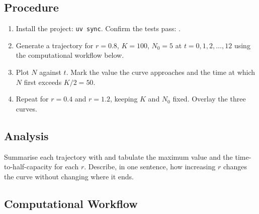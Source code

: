 \documentclass[
]{article}
\providecommand{\tightlist}{%
  \setlength{\itemsep}{0pt}\setlength{\parskip}{0pt}}
\theoremstyle{plain}
\theoremstyle{definition}
\begin{document}
\subsection{Procedure}\label{procedure-3}

\begin{enumerate}
\def\labelenumi{\arabic{enumi}.}
\tightlist
\item
  Install the project: \texttt{uv\ sync}. Confirm the tests pass:
  .
\item
  Generate a trajectory for \(r = 0.8\), \(K = 100\), \(N_0 = 5\) at
  \(t = 0, 1, 2, \dots, 12\) using the computational workflow below.
\item
  Plot \(N\) against \(t\). Mark the value the curve approaches and the
  time at which \(N\) first exceeds \(K/2 = 50\).
\item
  Repeat for \(r = 0.4\) and \(r = 1.2\), keeping \(K\) and \(N_0\)
  fixed. Overlay the three curves.
\end{enumerate}

\subsection{Analysis}\label{analysis-3}

Summarise each trajectory with
 and tabulate the
maximum value and the time-to-half-capacity for each \(r\). Describe, in
one sentence, how increasing \(r\) changes the curve without changing
where it ends.

\subsection{Computational Workflow}\label{computational-workflow-3}
\end{document}
